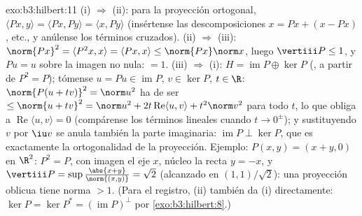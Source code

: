 \begin{solution}{exo:b3:hilbert:11}
(i) $\Rightarrow$ (ii): para la proyección ortogonal,
$\langle Px, y\rangle = \langle Px, Py\rangle = \langle x,
Py\rangle$ (insértense las descomposiciones $x = Px + (x - Px)$, etc., y
anúlense los términos cruzados). (ii) $\Rightarrow$ (iii):
$\norm{Px}^2 = \langle P^2x, x\rangle = \langle Px, x\rangle
\leq \norm{Px}\norm x$, luego $\vertiii P \leq 1$, y $Pu = u$ sobre la
imagen no nula: $= 1$. (iii) $\Rightarrow$ (i): $H =
\operatorname{im}P \oplus \ker P$
(, a partir de $P^2
= P$); tómense $u = Pu \in \operatorname{im}P$, $v \in \ker P$,
$t \in \R$: $\norm{P(u + tv)}^2 = \norm u^2$ ha de ser $\leq
\norm{u + tv}^2 = \norm u^2 + 2t\operatorname{Re}\langle u,
v\rangle + t^2\norm v^2$ para todo $t$, lo que obliga a
$\operatorname{Re}\langle u, v\rangle = 0$ (compárense los términos
lineales cuando $t \to 0^\pm$); y sustituyendo $v$ por $\iu v$ se anula
también la parte imaginaria: $\operatorname{im}P \perp
\ker P$, que es exactamente la ortogonalidad de la proyección. Ejemplo:
$P(x, y) = (x + y, 0)$ en $\R^2$: $P^2 = P$, con imagen el eje $x$,
núcleo la recta $y = -x$, y
$\vertiii P = \sup\frac{\abs{x+y}}{\norm{(x,y)}} = \sqrt2$
(alcanzado en $(1,1)/\sqrt2$): una proyección oblicua tiene norma $> 1$.
(Para el registro, (ii) también da (i) directamente:
$\ker P = \ker P^* = (\operatorname{im}P)^\perp$ por
\cref{exo:b3:hilbert:8}.)
\end{solution}

